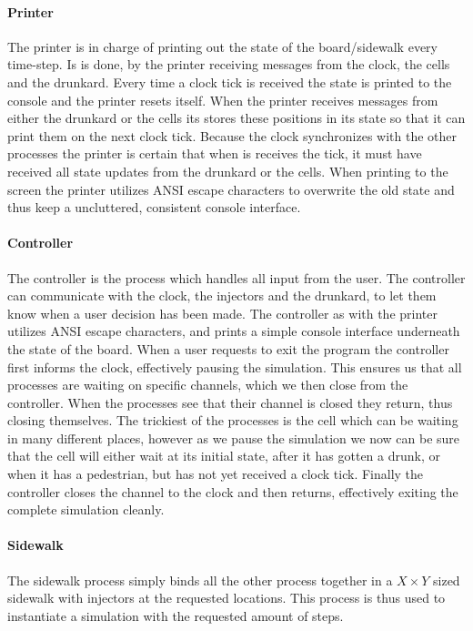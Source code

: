 \documentclass[a4paper, 11pt]{article}
\begin{document}
\paragraph{Printer} %
\label{par:printer}
The printer is in charge of printing out the state of the board/sidewalk every time-step. Is is done, by the printer receiving messages from the clock, the cells and the drunkard. Every time a clock tick is received the state is printed to the console and the printer resets itself. When the printer receives messages from either the drunkard or the cells its stores these positions in its state so that it can print them on the next clock tick. Because the clock synchronizes with the other processes the printer is certain that when is receives the tick, it must have received all state updates from the drunkard or the cells. When printing to the screen the printer utilizes ANSI escape characters to overwrite the old state and thus keep a uncluttered, consistent console interface.

\paragraph{Controller} %
\label{par:controller}
The controller is the process which handles all input from the user. The controller can communicate with the clock, the injectors and the drunkard, to let them know when a user decision has been made. The controller as with the printer utilizes ANSI escape characters, and prints a simple console interface underneath the state of the board. When a user requests to exit the program the controller first informs the clock, effectively pausing the simulation. This ensures us that all processes are waiting on specific channels, which we then close from the controller. When the processes see that their channel is closed they return, thus closing themselves. The trickiest of the processes is the cell which can be waiting in many different places, however as we pause the simulation we now can be sure that the cell will either wait at its initial state, after it has gotten a drunk, or when it has a pedestrian, but has not yet received a clock tick. Finally the controller closes the channel to the clock and then returns, effectively exiting the complete simulation cleanly. 

\paragraph{Sidewalk} %
\label{par:sidewalk}
The sidewalk process simply binds all the other process together in a $X \times Y$ sized sidewalk with injectors at the requested locations. This process is thus used to instantiate a simulation with the requested amount of steps.
\end{document}
